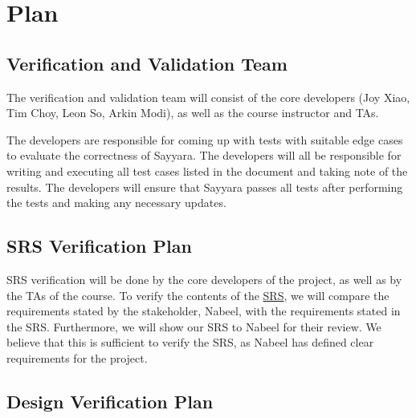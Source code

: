 \documentclass[12pt, titlepage]{article}
\begin{document}
\citet{SRS}

\section{Plan}


\subsection{Verification and Validation Team}

The verification and validation team will consist of the core developers (Joy Xiao, Tim Choy, Leon
So, Arkin Modi), as well as the course instructor and TAs.

The developers are responsible for coming up with tests with suitable edge cases to evaluate the
correctness of Sayyara. The developers will all be responsible for writing and executing all test
cases listed in the document and taking note of the results. The developers will ensure that
Sayyara passes all tests after performing the tests and making any necessary updates.

\subsection{SRS Verification Plan}

SRS verification will be done by the core developers of the project, as well as by the TAs of the
course. To verify the contents of the
\href{https://github.com/arkinmodi/project-sayyara/blob/main/docs/SRS/SRS.pdf}{SRS}, we will
compare the requirements stated by the stakeholder, Nabeel, with the requirements stated in the
SRS. Furthermore, we will show our SRS to Nabeel for their review. We believe that this is
sufficient to verify the SRS, as Nabeel has defined clear requirements for the project.



\subsection{Design Verification Plan}
\end{document}
